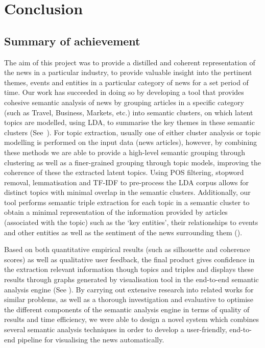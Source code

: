 \chapter{Conclusion}

\section{Summary of achievement}

The aim of this project was to provide a distilled and coherent representation of the news in a particular industry, to provide valuable insight into the pertinent themes, events and entities in a particular category of news for a set period of time. Our work has succeeded in doing so by developing a tool that provides cohesive semantic analysis of news by grouping articles in a specific category (such as Travel, Business, Markets, etc.) into semantic clusters, on which latent topics are modelled, using LDA, to summarise the key themes in these semantic clusters (See~). 
For topic extraction, usually one of either cluster analysis or topic modelling is performed on the input data (news articles), however, by combining these methods we are able to provide a high-level semantic grouping through clustering as well as a finer-grained grouping through topic models, improving the coherence of these the extracted latent topics.
 Using POS filtering, stopword removal, lemmatisation and TF-IDF to pre-process the LDA corpus allows for distinct topics with minimal overlap in the semantic clusters. Additionally, our tool performs semantic triple extraction for each topic in a semantic cluster to obtain a minimal representation of the information provided by articles (associated with the topic) such as the `key entities', their relationships to events and other entities as well as the sentiment of the news surrounding them ().  

Based on both quantitative empirical results (such as silhouette and coherence scores) as well as qualitative user feedback, the final product gives confidence in the extraction relevant information though topics and triples and displays these results through graphs generated by visualisation tool in the end-to-end semantic analysis engine (See ). By carrying out extensive research into related works for similar problems, as well as a thorough investigation and evaluative to optimise the different components of the semantic analysis engine in terms of quality of results and time efficiency, we were able to design a novel system which combines several semantic analysis techniques in order to develop a user-friendly, end-to-end pipeline for visualising the news automatically.


